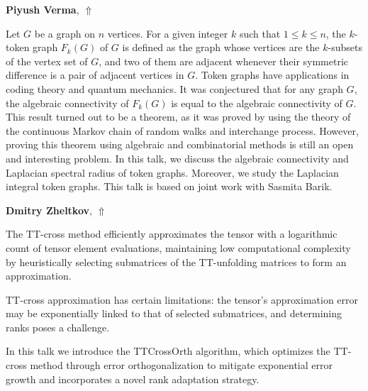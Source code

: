 \documentclass[ILAS2025-program.tex]{subfiles}
\begin{document}
\hypertarget{down0094}{}\begin{ilasabstract}
    
\textbf{Piyush Verma},  \hfill \hyperlink{up0094}{$\Uparrow$}
    
    
\mtskip
    Let $G$ be a graph on $n$ vertices. For a given integer $k$ such that $1\leq k \leq n$, the $k$-token graph $F_k(G)$ of $G$ is defined as the graph whose vertices are the $k$-subsets of the vertex set of $G$, and two of them are adjacent whenever their symmetric difference is a pair of adjacent vertices in $G$. Token graphs have applications in coding theory and quantum mechanics. It was conjectured that for any graph $G$, the algebraic connectivity of $F_k(G)$ is equal to the algebraic connectivity of $G$. This result turned out to be a theorem, as it was proved by using the theory of the continuous Markov chain of random walks and interchange process. However, proving this theorem using algebraic and combinatorial methods is still an open and interesting problem. In this talk, we discuss the algebraic connectivity and Laplacian spectral radius of token graphs. Moreover, we study the Laplacian integral token graphs. This talk is based on joint work with Sasmita Barik.
\end{ilasabstract}
    

\hypertarget{down0117}{}\begin{ilasabstract}
    
\textbf{Dmitry Zheltkov},  \hfill \hyperlink{up0117}{$\Uparrow$}
    
    
\mtskip
    The TT-cross method efficiently approximates the tensor with a logarithmic count of tensor element evaluations, maintaining low computational complexity by heuristically selecting submatrices of the TT-unfolding matrices to form an approximation.

TT-cross approximation has certain limitations: the tensor's approximation error may be exponentially linked to that of selected submatrices, and determining ranks poses a challenge.

In this talk we introduce the TTCrossOrth algorithm, which optimizes the TT-cross method through error orthogonalization to mitigate exponential error growth and incorporates a novel rank adaptation strategy.

\end{ilasabstract}
    \newpage
\end{document}

